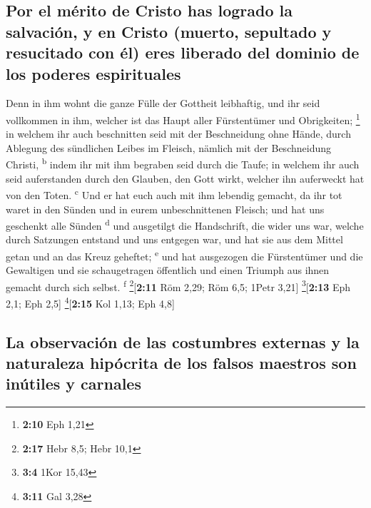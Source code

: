 \hypertarget{por-el-muxe9rito-de-cristo-has-logrado-la-salvaciuxf3n-y-en-cristo-muerto-sepultado-y-resucitado-con-uxe9l-eres-liberado-del-dominio-de-los-poderes-espirituales}{%
\subsection{Por el mérito de Cristo has logrado la salvación, y en
Cristo (muerto, sepultado y resucitado con él) eres liberado del dominio
de los poderes
espirituales}\label{por-el-muxe9rito-de-cristo-has-logrado-la-salvaciuxf3n-y-en-cristo-muerto-sepultado-y-resucitado-con-uxe9l-eres-liberado-del-dominio-de-los-poderes-espirituales}}

 Denn in ihm wohnt die ganze Fülle der Gottheit
leibhaftig,  und ihr seid vollkommen in ihm, welcher ist
das Haupt aller Fürstentümer und Obrigkeiten; \footnote{\textbf{2:10}
  Eph 1,21}  in welchem ihr auch beschnitten seid mit der
Beschneidung ohne Hände, durch Ablegung des sündlichen Leibes im
Fleisch, nämlich mit der Beschneidung Christi, \textsuperscript{b}
 indem ihr mit ihm begraben seid durch die Taufe; in
welchem ihr auch seid auferstanden durch den Glauben, den Gott wirkt,
welcher ihn auferweckt hat von den Toten. \textsuperscript{c}
 Und er hat euch auch mit ihm lebendig gemacht, da ihr
tot waret in den Sünden und in eurem unbeschnittenen Fleisch; und hat
uns geschenkt alle Sünden \textsuperscript{d}  und
ausgetilgt die Handschrift, die wider uns war, welche durch Satzungen
entstand und uns entgegen war, und hat sie aus dem Mittel getan und an
das Kreuz geheftet; \textsuperscript{e}  und hat
ausgezogen die Fürstentümer und die Gewaltigen und sie schaugetragen
öffentlich und einen Triumph aus ihnen gemacht durch sich selbst.
\textsuperscript{f} \footnote{\textbf{2:17} Hebr 8,5; Hebr 10,1}{[}\textbf{2:11}
Röm 2,29; Röm 6,5; 1Petr 3,21{]} \footnote{\textbf{3:4} 1Kor 15,43}{[}\textbf{2:13}
Eph 2,1; Eph 2,5{]} \footnote{\textbf{3:11} Gal 3,28}{[}\textbf{2:15}
Kol 1,13; Eph 4,8{]}

\hypertarget{la-observaciuxf3n-de-las-costumbres-externas-y-la-naturaleza-hipuxf3crita-de-los-falsos-maestros-son-inuxfatiles-y-carnales}{%
\subsection{La observación de las costumbres externas y la naturaleza
hipócrita de los falsos maestros son inútiles y
carnales}\label{la-observaciuxf3n-de-las-costumbres-externas-y-la-naturaleza-hipuxf3crita-de-los-falsos-maestros-son-inuxfatiles-y-carnales}}

